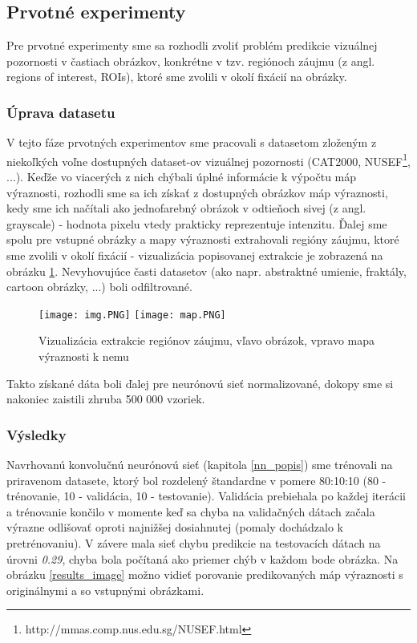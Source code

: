 \subsection{Prvotné experimenty}
\label{first_experiments}
Pre prvotné experimenty sme sa rozhodli zvoliť problém predikcie vizuálnej pozornosti v častiach obrázkov, konkrétne v tzv. regiónoch záujmu (z angl. regions of interest, ROIs), ktoré sme zvolili v okolí fixácií na obrázky.

\subsubsection{Úprava datasetu}
\label{dataset}

V tejto fáze prvotných experimentov sme pracovali s datasetom zloženým z niekoľkých voľne dostupných dataset-ov vizuálnej pozornosti (CAT2000\cite{borji2015cat2000}, NUSEF\footnote{http://mmas.comp.nus.edu.sg/NUSEF.html}, ...).
Keďže vo viacerých z nich chýbali úplné informácie k výpočtu máp výraznosti, rozhodli sme sa ich získať z dostupných obrázkov máp výraznosti, kedy sme ich načítali ako jednofarebný  obrázok v odtieňoch sivej (z angl. grayscale) - hodnota pixelu vtedy prakticky reprezentuje intenzitu. Ďalej sme spolu pre vstupné obrázky a mapy výraznosti extrahovali regióny záujmu, ktoré sme zvolili v okolí fixácií - vizualizácia popisovanej extrakcie je zobrazená na obrázku \ref{roi_image}. Nevyhovujúce časti datasetov (ako napr. abstraktné umienie, fraktály, cartoon obrázky, ...) boli odfiltrované.

\begin{figure}[H]
	\begin{center}
		\texttt{[image: img.PNG]}
		\texttt{[image: map.PNG]}
		\caption[Vizualizácia extrakcie regiónov záujmu]{
			Vizualizácia extrakcie regiónov záujmu, vľavo obrázok, vpravo mapa výraznosti k nemu
		}\label{roi_image}
	\end{center}
\end{figure}

Takto získané dáta boli ďalej pre neurónovú sieť normalizované, dokopy sme si nakoniec zaistili zhruba 500 000 vzoriek.
\newline

\subsubsection{Výsledky}

Navrhovanú konvolučnú neurónovú sieť (kapitola \ref{nn_popis}) sme trénovali na priravenom datasete, ktorý bol rozdelený štandardne v pomere 80:10:10 (80 - trénovanie, 10 - validácia, 10 - testovanie). Validácia prebiehala po každej iterácii a trénovanie končilo v momente keď sa chyba na validačných dátach začala výrazne odlišovať oproti najnižšej dosiahnutej (pomaly dochádzalo k pretrénovaniu). V závere mala sieť chybu predikcie na testovacích dátach na úrovni \textit{0.29}, chyba bola počítaná ako priemer chýb v každom bode obrázka. Na obrázku \ref{results_image} možno vidieť porovanie predikovaných máp výraznosti s originálnymi a so vstupnými obrázkami. 

